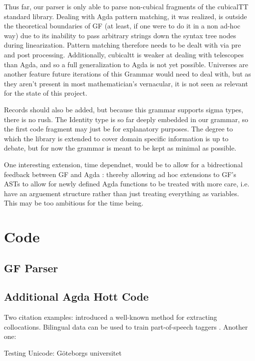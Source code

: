 \documentclass[11pt, a4paper]{article}
\begin{document}
Thus far, our parser is only able to parse non-cubical fragments of the
cubicalTT standard library. Dealing with Agda pattern matching, it was
realized, is outside the theoretical boundaries of GF (at least, if one were to
do it in a non ad-hoc way) due to its inability to pass arbitrary strings down
the syntax tree nodes during linearization. Pattern matching therefore needs to be dealt
with via pre and post processing.  Additionally, cubicaltt is weaker at
dealing with telescopes than Agda, and so a full generalization to Agda is not
yet possible. Universes are another feature future iterations of this Grammar
would need to deal with, but as they aren't present in most mathematician's
vernacular, it is not seen as relevant for the state of this project.

Records should also be added, but because this grammar supports sigma types,
there is no rush. The Identity type is so far deeply embedded in our grammar,
so the first code fragment may just be for explanatory purposes.  The degree to
which the library is extended to cover domain specific information is up to
debate, but for now the grammar is meant to be kept as minimal as possible.

One interesting extension, time dependnet, would be to allow for a bidrectional
feedback between GF and Agda : thereby allowing ad hoc extensions to GF's ASTs
to allow for newly defined Agda functions to be treated with more care, i.e.
have an arguement structure rather than just treating everything as variables.
This may be too ambitious for the time being.

\section{Code}

\subsection{GF Parser}

\subsection{Additional Agda Hott Code}

Two citation examples: 
\cite{dunning1993} introduced a well-known method for extracting
collocations. Bilingual data can be used to train part-of-speech
taggers \citep{das2011}. Another one: \citep{cortes2014}

Testing Unicode: Göteborgs universitet
\end{document}
